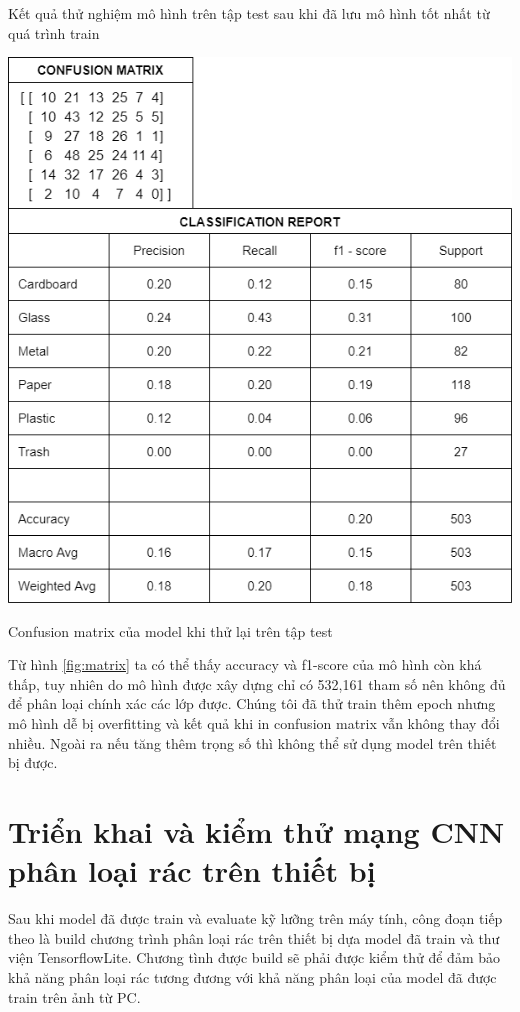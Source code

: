 Kết quả thử nghiệm mô hình trên tập test sau khi đã lưu mô hình tốt nhất từ quá trình train 
\begin{table}[H]
    \centering
    \includegraphics[width=\linewidth]{images/Quanh/matrix.png}
    \caption{Confusion matrix của model khi thử lại trên tập test}
    \label{fig:matrix}
\end{table}
Từ hình \ref{fig:matrix} ta có thể thấy accuracy và f1-score của mô hình còn khá thấp, tuy nhiên do mô hình được xây dựng chỉ có 532,161 tham số nên không đủ để phân loại chính xác các lớp được. Chúng tôi đã thử train thêm epoch nhưng mô hình dễ bị overfitting và kết quả khi in confusion matrix vẫn không thay đổi nhiều. Ngoài ra nếu tăng thêm trọng số thì không thể sử dụng model trên thiết bị được.


\section{Triển khai và kiểm thử mạng CNN phân loại rác trên thiết bị}
Sau khi model đã được train và evaluate kỹ lưỡng trên máy tính, công đoạn tiếp theo là build chương trình phân loại rác trên thiết bị dựa model đã train và thư viện TensorflowLite. 
Chương tình được build sẽ phải được kiểm thử để đảm bảo khả năng phân loại rác tương đương với khả năng phân loại của model đã được train trên ảnh từ PC.

